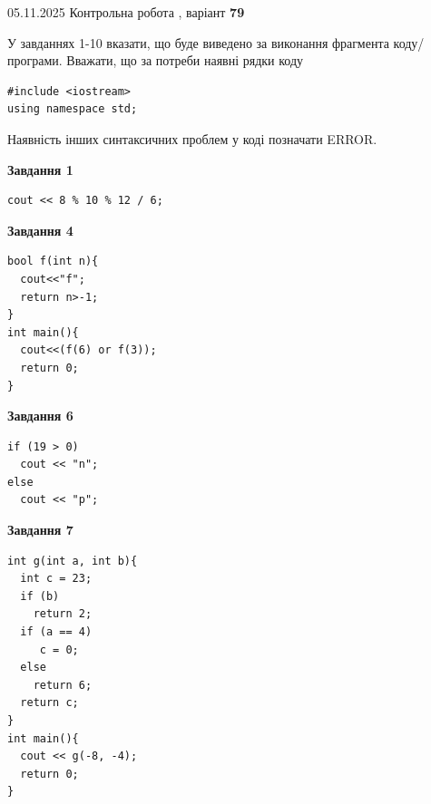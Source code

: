 \documentclass[12pt, ukrainian]{article}
\begin{document}
{\Large{05.11.2025 Контрольна робота , варіант  \No \textbf { 79 }\par}}
{
\begin {large}
У завданнях 1-10 вказати, що буде виведено за виконання фрагмента коду/про\-гра\-ми.
Вважати, що за потреби наявні рядки коду
\begin{verbatim}
#include <iostream>
using namespace std;
\end{verbatim}
Наявність інших синтаксичних проблем у коді позначати ERROR.

\begin{minipage}[t]{7.0cm}

\begin{center}
\textbf{Завдання 1}
\end{center}
\vspace{-8mm}

\begin{verbatim}
cout << 8 % 10 % 12 / 6;
\end{verbatim}



\begin{center}
\textbf{Завдання 4}
\end{center}
\vspace{-8mm}

\begin{verbatim}
bool f(int n){
  cout<<"f";
  return n>-1;
}
int main(){
  cout<<(f(6) or f(3));
  return 0;
}
\end{verbatim}



\begin{center}
\textbf{Завдання 6}
\end{center}
\vspace{-8mm}

\begin{verbatim}
if (19 > 0)
  cout << "n";
else
  cout << "p";
\end{verbatim}



\begin{center}
\textbf{Завдання 7}
\end{center}
\vspace{-8mm}

\begin{verbatim}
int g(int a, int b){
  int c = 23;
  if (b)
    return 2;
  if (a == 4)
     c = 0;
  else
    return 6;
  return c;
}
int main(){
  cout << g(-8, -4);
  return 0;
}
\end{verbatim}


\end{minipage}
\end{large}}
\end{document}
